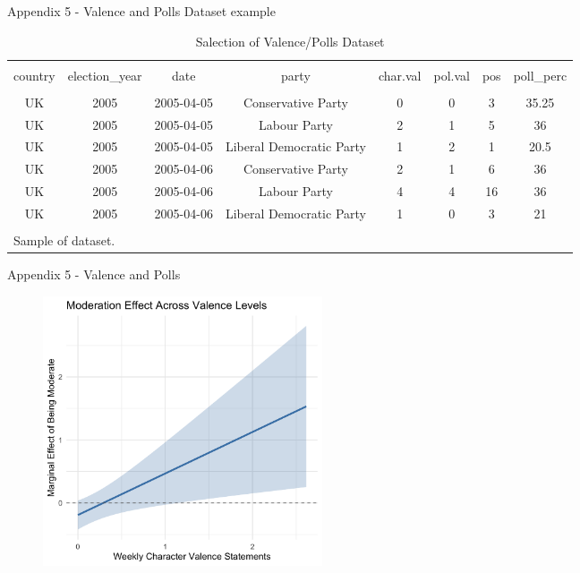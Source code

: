 \documentclass[9pt, aspectratio=169]{beamer}
\begin{document}
\begin{frame}{Appendix 5 - Valence and Polls Dataset example}
    \begin{table}[!htbp] \centering 
        \caption{Salection of Valence/Polls Dataset} 
        \label{tab:uk_election_preview} 
      \small 
      \begin{tabular}{cccccccc} 
      \\[-1.8ex]\hline 
      \hline \\[-1.8ex] 
      country & election\_year & date & party & char.val & pol.val & pos & poll\_perc \\ 
      \hline \\[-1.8ex] 
      UK & 2005 & 2005-04-05 & Conservative Party & 0 & 0 & 3 & 35.25 \\ 
      UK & 2005 & 2005-04-05 & Labour Party & 2 & 1 & 5 & 36 \\ 
      UK & 2005 & 2005-04-05 & Liberal Democratic Party & 1 & 2 & 1 & 20.5 \\ 
      UK & 2005 & 2005-04-06 & Conservative Party & 2 & 1 & 6 & 36 \\ 
      UK & 2005 & 2005-04-06 & Labour Party & 4 & 4 & 16 & 36 \\ 
      UK & 2005 & 2005-04-06 & Liberal Democratic Party & 1 & 0 & 3 & 21 \\ 
      \hline \\[-1.8ex] 
      \multicolumn{8}{l}{Sample of dataset.} \\ 
      \end{tabular} 
      \end{table} 
\end{frame}

\begin{frame}{Appendix 5 - Valence and Polls}
    \begin{figure}
        \centering
        \includegraphics[width=0.4\textwidth]{images/me_moderation.png}
        \label{fig:poll_moderation2}
    \end{figure}
\end{frame}
\end{document}
